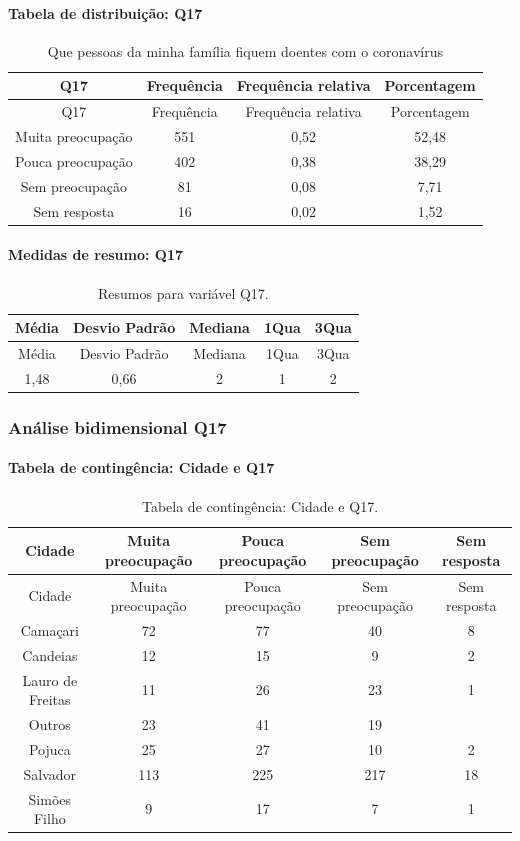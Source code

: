 \documentclass[]{article}
\let\oldparagraph\paragraph
\renewcommand{\paragraph}[1]{\oldparagraph{#1}\mbox{}}
\begin{document}
\hypertarget{tabela-de-distribuiuxe7uxe3o-q17}{%
\paragraph{Tabela de distribuição: Q17}\label{tabela-de-distribuiuxe7uxe3o-q17}}

\begin{longtable}[]{@{}cccc@{}}
\caption{\label{tab:unnamed-chunk-188}Que pessoas da minha família fiquem doentes com o coronavírus}\tabularnewline
\toprule
Q17 & Frequência & Frequência relativa & Porcentagem\tabularnewline
\midrule
\endfirsthead
\toprule
Q17 & Frequência & Frequência relativa & Porcentagem\tabularnewline
\midrule
\endhead
Muita preocupação & 551 & 0,52 & 52,48\tabularnewline
Pouca preocupação & 402 & 0,38 & 38,29\tabularnewline
Sem preocupação & 81 & 0,08 & 7,71\tabularnewline
Sem resposta & 16 & 0,02 & 1,52\tabularnewline
\bottomrule
\end{longtable}

\hypertarget{medidas-de-resumo-q17}{%
\paragraph{Medidas de resumo: Q17}\label{medidas-de-resumo-q17}}

\begin{longtable}[]{@{}ccccc@{}}
\caption{\label{tab:unnamed-chunk-189}Resumos para variável Q17.}\tabularnewline
\toprule
Média & Desvio Padrão & Mediana & 1Qua & 3Qua\tabularnewline
\midrule
\endfirsthead
\toprule
Média & Desvio Padrão & Mediana & 1Qua & 3Qua\tabularnewline
\midrule
\endhead
1,48 & 0,66 & 2 & 1 & 2\tabularnewline
\bottomrule
\end{longtable}

\cleardoublepage

\hypertarget{anuxe1lise-bidimensional-q17}{%
\subsubsection{Análise bidimensional Q17}\label{anuxe1lise-bidimensional-q17}}

\hypertarget{tabela-de-continguxeancia-cidade-e-q17}{%
\paragraph{Tabela de contingência: Cidade e Q17}\label{tabela-de-continguxeancia-cidade-e-q17}}

\begin{longtable}[]{@{}ccccc@{}}
\caption{\label{tab:unnamed-chunk-190}Tabela de contingência: Cidade e Q17.}\tabularnewline
\toprule
Cidade & Muita preocupação & Pouca preocupação & Sem preocupação & Sem resposta\tabularnewline
\midrule
\endfirsthead
\toprule
Cidade & Muita preocupação & Pouca preocupação & Sem preocupação & Sem resposta\tabularnewline
\midrule
\endhead
Camaçari & 72 & 77 & 40 & 8\tabularnewline
Candeias & 12 & 15 & 9 & 2\tabularnewline
Lauro de Freitas & 11 & 26 & 23 & 1\tabularnewline
Outros & 23 & 41 & 19 &\tabularnewline
Pojuca & 25 & 27 & 10 & 2\tabularnewline
Salvador & 113 & 225 & 217 & 18\tabularnewline
Simões Filho & 9 & 17 & 7 & 1\tabularnewline
\bottomrule
\end{longtable}
\end{document}
